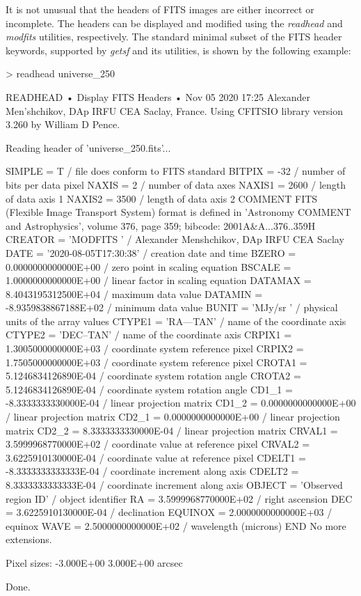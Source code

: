 \documentclass[a4paper,10pt]{article}
\begin{document}
It is not unusual that the headers of FITS images are either incorrect or incomplete. The headers can be displayed and modified
using the \textsl{readhead} and \textsl{modfits} utilities, respectively. The standard minimal subset of the FITS header keywords,
supported by \textsl{getsf} and its utilities, is shown by the following example:
\begin{verbnobox}[\mbox{}\small]
> readhead universe_250

 READHEAD • Display FITS Headers • Nov 05 2020 17:25
 Alexander Men’shchikov, DAp IRFU CEA Saclay, France.
 Using CFITSIO library version 3.260 by William D Pence.

   Reading header of 'universe_250.fits'...

 SIMPLE  =                    T / file does conform to FITS standard
 BITPIX  =                  -32 / number of bits per data pixel
 NAXIS   =                    2 / number of data axes
 NAXIS1  =                 2600 / length of data axis 1
 NAXIS2  =                 3500 / length of data axis 2
 COMMENT   FITS (Flexible Image Transport System) format is defined in 'Astronomy
 COMMENT   and Astrophysics', volume 376, page 359; bibcode: 2001A&A...376..359H
 CREATOR = 'MODFITS '           / Alexander Menshchikov, DAp IRFU CEA Saclay
 DATE    = '2020-08-05T17:30:38' / creation date and time
 BZERO   =  0.0000000000000E+00 / zero point in scaling equation
 BSCALE  =  1.0000000000000E+00 / linear factor in scaling equation
 DATAMAX =  8.4043195312500E+04 / maximum data value
 DATAMIN = -8.9359838867188E+02 / minimum data value
 BUNIT   = 'MJy/sr  '           / physical units of the array values
 CTYPE1  = 'RA---TAN'           / name of the coordinate axis
 CTYPE2  = 'DEC--TAN'           / name of the coordinate axis
 CRPIX1  =  1.3005000000000E+03 / coordinate system reference pixel
 CRPIX2  =  1.7505000000000E+03 / coordinate system reference pixel
 CROTA1  =  5.1246834126890E-04 / coordinate system rotation angle
 CROTA2  =  5.1246834126890E-04 / coordinate system rotation angle
 CD1_1   = -8.3333333330000E-04 / linear projection matrix
 CD1_2   =  0.0000000000000E+00 / linear projection matrix
 CD2_1   =  0.0000000000000E+00 / linear projection matrix
 CD2_2   =  8.3333333330000E-04 / linear projection matrix
 CRVAL1  =  3.5999968770000E+02 / coordinate value at reference pixel
 CRVAL2  =  3.6225910130000E-04 / coordinate value at reference pixel
 CDELT1  = -8.3333333333333E-04 / coordinate increment along axis
 CDELT2  =  8.3333333333333E-04 / coordinate increment along axis
 OBJECT  = 'Observed region ID' / object identifier
 RA      =  3.5999968770000E+02 / right ascension
 DEC     =  3.6225910130000E-04 / declination
 EQUINOX =  2.0000000000000E+03 / equinox
 WAVE    =  2.5000000000000E+02 / wavelength (microns)
 END
 No more extensions.

 Pixel sizes: -3.000E+00 3.000E+00 arcsec
 
 Done.
\end{verbnobox}
\end{document}

